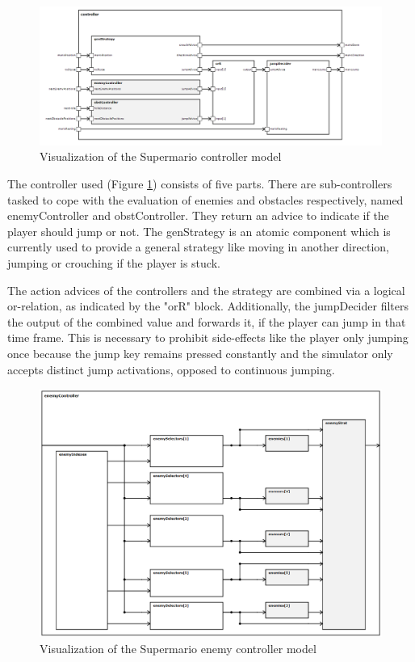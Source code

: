\begin{figure}
	\centering
	\includegraphics[width=\textwidth]{pictures/haller_controller.PNG}
	\caption{Visualization of the Supermario controller model}
	\label{fig:marioController}
\end{figure}

The controller used (Figure \ref{fig:marioController}) consists of five parts. There are sub-controllers tasked to cope with the evaluation of enemies and obstacles respectively, named enemyController and obstController. They return an advice to indicate if the player should jump or not. The genStrategy is an atomic component which is currently used to provide a general strategy like moving in another direction, jumping or crouching if the player is stuck. 

The action advices of the controllers and the strategy are combined via a logical or-relation, as indicated by the "orR" block. Additionally, the jumpDecider filters the output of the combined value and forwards it, if the player can jump in that time frame. This is necessary to prohibit side-effects like the player only jumping once because the jump key remains pressed constantly and the simulator only accepts distinct jump activations, opposed to continuous jumping.

\begin{figure}
	\centering
	\includegraphics[scale=0.4]{pictures/haller_enemycontroller.PNG}
	\caption{Visualization of the Supermario enemy controller model}
	\label{fig:marioEnemyController}
\end{figure}

